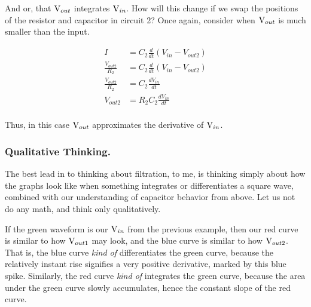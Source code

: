 \documentclass[12pt]{report}
\newcommand{\pr}[1]{\left(#1\right)}
\newcommand{\V}{{\rm V}}
\begin{document}
And or, that $\V_{out}$ integrates $\V_{in}$. How will this change if we swap the positions of the resistor and capacitor in circuit 2? Once again, consider when $\V_{out}$ is much smaller than the input. 

\begin{equation} \label{cap5}
\begin{split}
{I} &= {C_2}\frac{d}{dt} \pr{V_{in} - V_{out2}}\\
{\frac{V_{out2}}{R_2}} &= {C_2}\frac{d}{dt} \pr{V_{in} - V_{out2}}\\
{\frac{V_{out2}}{R_2}} &= {C_2}\frac{d V_{in}}{dt}\\
V_{out2} &= R_2{C_2}\frac{d V_{in}}{dt}\\
\end{split}
\end{equation}\newline

Thus, in this case $\V_{out}$ approximates the derivative of $\V_{in}$. 

\subsubsection{Qualitative Thinking.}

The best lead in to thinking about filtration, to me, is thinking simply about how the graphs look like when something integrates or differentiates a square wave, combined with our understanding of capacitor behavior from above. Let us not do any math, and think only qualitatively. 

\begin{centering}
    
\end{centering}

If the green waveform is our $\V_{in}$ from the previous example, then our red curve is similar to how $\V_{out1}$ may look, and the blue curve is similar to how $\V_{out2}$. That is, the blue curve \textit{kind of} differentiates the green curve, because the relatively instant rise signifies a very positive derivative, marked by this blue spike. Similarly, the red curve \textit{kind of} integrates the green curve, because the area under the green curve slowly accumulates, hence the constant slope of the red curve.\newline 
\end{document}
